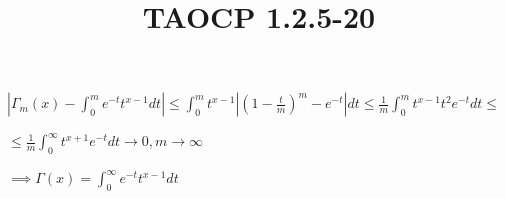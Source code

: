 \documentclass{article}
\title{TAOCP 1.2.5\mbox{-}20}
\begin{document}
\maketitle

\( |\Gamma_{m}(x) - \int_{0}^{m} e^{-t}t^{x-1}dt| \leq \int_{0}^{m} t^{x-1}|{(1-\frac{t}{m})}^{m} - e^{-t}|dt \leq \frac{1}{m}\int_{0}^{m} t^{x-1}t^{2}e^{-t}dt \leq \)

\( \leq \frac{1}{m} \int_{0}^{\infty} t^{x+1}e^{-t}dt \to 0, m \to \infty \)

\( \implies \Gamma(x) = \int_{0}^{\infty} e^{-t}t^{x-1}dt \)
\end{document}
